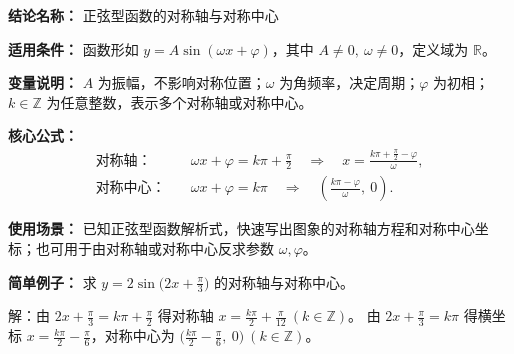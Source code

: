 \textbf{结论名称：} 正弦型函数的对称轴与对称中心

\textbf{适用条件：} 函数形如 \( y = A\sin(\omega x + \varphi) \)，其中 \( A \neq 0,\ \omega \neq 0 \)，定义域为 \(\mathbb{R}\)。

\textbf{变量说明：} \( A \) 为振幅，不影响对称位置；\( \omega \) 为角频率，决定周期；\( \varphi \) 为初相；\( k \in \mathbb{Z} \) 为任意整数，表示多个对称轴或对称中心。

\textbf{核心公式：}
\[
\boxed{
\begin{aligned}
\text{对称轴：}&\quad \omega x + \varphi = k\pi + \frac{\pi}{2} \quad \Rightarrow \quad x = \frac{k\pi + \frac{\pi}{2} - \varphi}{\omega}, \\[4pt]
\text{对称中心：}&\quad \omega x + \varphi = k\pi \quad \Rightarrow \quad \left( \frac{k\pi - \varphi}{\omega},\ 0 \right).
\end{aligned}
}
\]

\textbf{使用场景：} 已知正弦型函数解析式，快速写出图象的对称轴方程和对称中心坐标；也可用于由对称轴或对称中心反求参数 \(\omega,\varphi\)。

\textbf{简单例子：} 求 \( y = 2\sin\!\bigl(2x + \frac{\pi}{3}\bigr) \) 的对称轴与对称中心。

解：由 \( 2x + \frac{\pi}{3} = k\pi + \frac{\pi}{2} \) 得对称轴 \( x = \frac{k\pi}{2} + \frac{\pi}{12}\ (k\in\mathbb{Z}) \)。  
由 \( 2x + \frac{\pi}{3} = k\pi \) 得横坐标 \( x = \frac{k\pi}{2} - \frac{\pi}{6} \)，对称中心为 \( \bigl( \frac{k\pi}{2} - \frac{\pi}{6},\ 0 \bigr)\ (k\in\mathbb{Z}) \)。